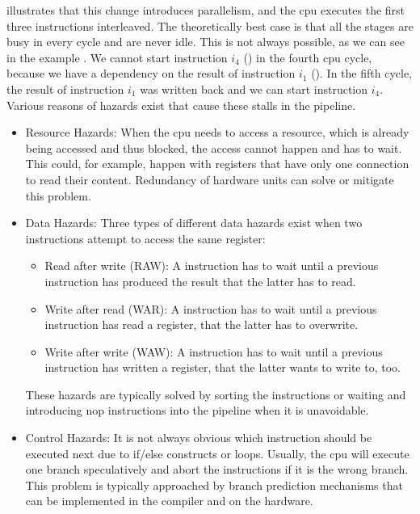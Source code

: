  illustrates that this change introduces parallelism, and the \ac{cpu} executes the first three instructions interleaved.
The theoretically best case is that all the stages are busy in every cycle and are never idle.
This is not always possible, as we can see in the example .
We cannot start instruction $i_4$ () in the fourth \ac{cpu} cycle, because we have a dependency on the result of instruction $i_1$ ().
In the fifth cycle, the result of instruction $i_1$ was written back and we can start instruction $i_4$.
Various reasons of hazards exist that cause these stalls in the pipeline.
\begin{itemize}
    \item Resource Hazards:
        When the \ac{cpu} needs to access a resource, which is already being accessed and thus blocked, the access cannot happen and has to wait.
        This could, for example, happen with registers that have only one connection to read their content.
        Redundancy of hardware units can solve or mitigate this problem.
    \item Data Hazards:
        Three types of different data hazards exist when two instructions attempt to access the same register:
        \begin{itemize}
            \item Read after write (RAW): A instruction has to wait until a previous instruction has produced the result that the latter has to read.
            \item Write after read (WAR): A instruction has to wait until a previous instruction has read a register, that the latter has to overwrite.
            \item Write after write (WAW): A instruction has to wait until a previous instruction has written a register, that the latter wants to write to, too.
        \end{itemize}
        These hazards are typically solved by sorting the instructions or waiting and introducing \ac{nop} instructions into the pipeline when it is unavoidable.
    \item Control Hazards:
        It is not always obvious which instruction should be executed next due to if/else constructs or loops.
        Usually, the \ac{cpu} will execute one branch speculatively and abort the instructions if it is the wrong branch.
        This problem is typically approached by branch prediction mechanisms that can be implemented in the compiler and on the hardware.
\end{itemize}

